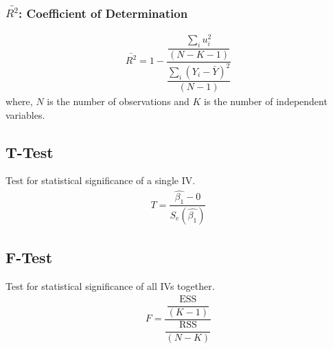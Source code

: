 \documentclass[openany,b5paper]{article}
\begin{document}
\subsubsection{$\bar{R^2}$: Coefficient of Determination}
\begin{align}
	\bar{R^2}= 1 - \dfrac{\dfrac{\sum_i u_i^2}{(N-K-1)}}{\dfrac{\sum_i (Y_i-\bar{Y})^2}{(N-1)}}
\end{align}
where, $N$ is the number of observations and $K$ is the number of independent variables.

\subsection{T-Test}
Test for statistical significance of a single IV.
\begin{align}
	T = \dfrac{\hat{\beta_1}-0}{S_e(\hat{\beta_1})}
\end{align}
\subsection{F-Test}
Test for statistical significance of all IVs together.
\begin{align}
	F = \dfrac{\dfrac{\text{ESS}}{(K-1)}}{\dfrac{\text{RSS}}{(N-K)}} \tag{$F \geq F_c, H_0$ is rejected}
\end{align}
\end{document}
